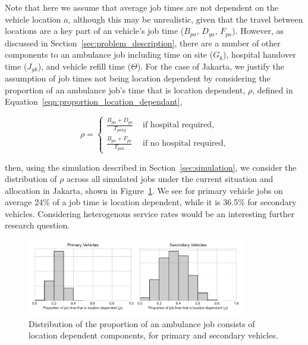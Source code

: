 \documentclass[preprint,12pt]{elsarticle}
\begin{document}
Note that here we assume that average job times are not dependent on the vehicle
location $a$, although this may be unrealistic, given that the travel between
locations are a key part of an vehicle's job time ($B_{pa}$, $D_{ya}$, $F_{pa}$).
However, as discussed in Section~\ref{sec:problem_description}, there are a
number of other components to an ambulance job including time on site ($G_k$),
hospital handover time ($J_{yk}$), and vehicle refill time ($\Theta$). For the
case of Jakarta, we justify the assumption of job times not being location
dependent by considering the proportion of an ambulance job's time that is
location dependent, $\rho$, defined in
Equation~\ref{eqn:proportion_location_dependant},

\begin{equation}\label{eqn:proportion_location_dependant}
\rho = \begin{cases}
  \frac{B_{pa} + D_{ya}}{T_{paky}} & \text{ if hospital required,} \\[8pt]
  \frac{B_{pa} + F_{pa}}{T_{pak}} & \text{ if no hospital required,}
\end{cases}
\end{equation}

\noindent
then, using the simulation described in Section~\ref{sec:simulation}, we
consider the distribution of $\rho$ across all simulated jobs under the current
situation and allocation in Jakarta, shown in Figure~\ref{fig:rho_distribution}.
We see for primary vehicle jobs on average 24\% of a job time is location
dependent, while it is 36.5\% for secondary vehicles. Considering heterogenous
service rates would be an interesting further research question.

\begin{figure}
    \centering
    \includegraphics[width=0.85\textwidth]{img/location_dependant_service_time_proportion}
    \caption{Distribution of the proportion of an ambulance job consists of
    location dependent components, for primary and secondary vehicles.}
    \label{fig:rho_distribution}
\end{figure}
\end{document}
